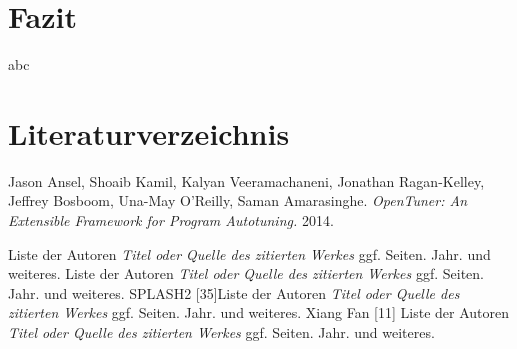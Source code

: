 \documentclass[a4paper,11pt]{scrartcl}
\begin{document}
\section{Fazit}
abc


\section{Literaturverzeichnis}

\begin{thebibliography}{9}
   
  
     Jason Ansel, Shoaib Kamil, Kalyan Veeramachaneni, Jonathan Ragan-Kelley, Jeffrey Bosboom, Una-May O'Reilly, Saman Amarasinghe. \emph{OpenTuner: An Extensible Framework for Program Autotuning.}
    2014.
   
 Liste der Autoren \emph{Titel oder Quelle des zitierten Werkes} ggf. Seiten.
    Jahr. und weiteres.
 Liste der Autoren \emph{Titel oder Quelle des zitierten Werkes} ggf. Seiten.
    Jahr. und weiteres.
 SPLASH2 [35]Liste der Autoren \emph{Titel oder Quelle des zitierten Werkes} ggf. Seiten.
    Jahr. und weiteres.
 Xiang Fan [11] Liste der Autoren \emph{Titel oder Quelle des zitierten Werkes} ggf. Seiten.
    Jahr. und weiteres.

\end{thebibliography}


\end{document}
